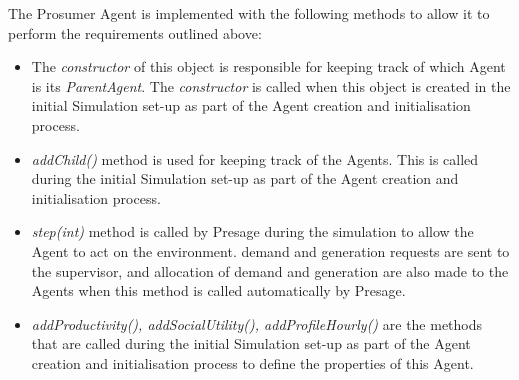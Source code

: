 The Prosumer Agent is implemented with the following methods to allow it to perform the requirements outlined above:
\begin{itemize}
	\item The \textit{constructor} of this object is responsible for keeping track of which Agent is its \textit{ParentAgent}. The \textit{constructor} is called when this object is created in the initial Simulation set-up as part of the Agent creation and initialisation process.
	\item \textit{addChild()} method is used for keeping track of the Agents. This is called during the initial Simulation set-up as part of the Agent creation and initialisation process.
	\item \textit{step(int)} method is called by Presage during the simulation to allow the Agent to act on the environment. demand and generation requests are sent to the supervisor, and allocation of demand and generation are also made to the Agents when this method is called automatically by Presage.
	\item \textit{addProductivity(), addSocialUtility(), addProfileHourly()} are the methods that are called during the initial Simulation set-up as part of the Agent creation and initialisation process to define the properties of this Agent.
\end{itemize}


